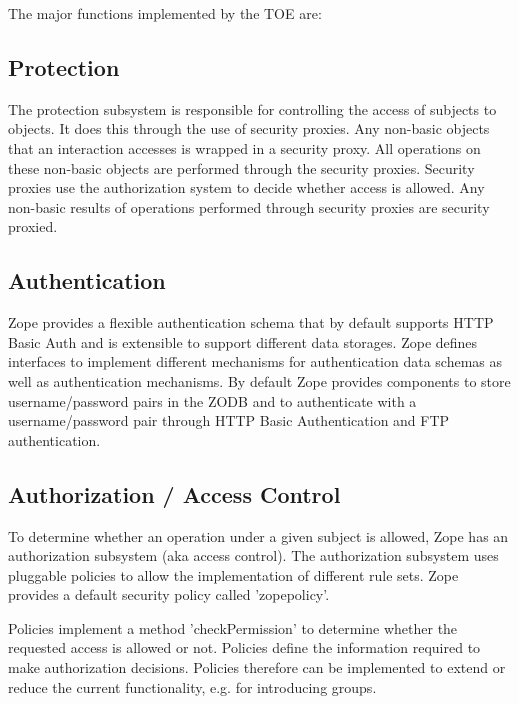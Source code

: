 \documentclass[12pt,english]{scrbook}
\begin{document}
The major functions implemented by the TOE are:




\subsection{Protection}

The protection subsystem is responsible for controlling the access of subjects
to objects.  It does this through the use of security proxies.  Any non-basic
objects that an interaction accesses is wrapped in a security proxy.  All
operations on these non-basic objects are performed through the security
proxies. Security proxies use the authorization system to decide whether access
is allowed.  Any non-basic results of operations performed through security
proxies are security proxied.




\subsection{Authentication}

Zope provides a flexible authentication schema that by default supports HTTP
Basic Auth and is extensible to support different data
storages. Zope defines interfaces to implement different mechanisms for
authentication data schemas as well as authentication mechanisms. By default
Zope provides components to store username/password pairs in the ZODB and to
authenticate with a username/password pair through HTTP Basic Authentication
and FTP authentication.





\subsection{Authorization / Access Control}

To determine whether an operation under a given subject is allowed, Zope has an
authorization subsystem (aka access control). The authorization subsystem uses
pluggable policies to allow the implementation of different rule sets. Zope
provides a default security policy called 'zopepolicy'.

Policies implement a method 'checkPermission' to determine whether the
requested access is allowed or not. Policies define the information required to
make authorization decisions.  Policies therefore can be implemented to extend
or reduce the current functionality, e.g. for introducing groups.
\end{document}

